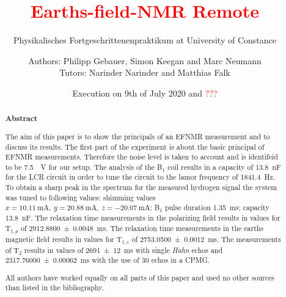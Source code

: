 \title{\textcolor{red}{Earths-field-NMR Remote}}
\subtitle{Physikalisches Fortgeschrittenenpraktikum at University of Constance}
\author{Authors: Philipp Gebauer, Simon Keegan and Marc Neumann \\ \large{Tutors: Narinder Narinder and Matthias Falk}}
\date{Execution on 9th of July 2020 and \textcolor{red}{???}}
\maketitle
\begin{abstract}
    \begin{center}
        \Large{\textsf{\textbf{Abstract}}}
    \end{center}
    \vspace{0.75 cm}
    \begin{singlespace}
    \noindent The aim of this paper is to show the principals of an EFNMR measurement and to discuss its results.\newline
    The first part of the experiment is about the basic principal of EFNMR measurements. Therefore the noise level is taken to account and is identifeid to be \SI{7.5}{\mu \volt} for our setup. The analysis of the B$_1$ coil results in a capacity of \SI{13.8}{\nano \farad} for the LCR circuit in order to tune the circuit to the lamor frequency of \SI{1841.4}{\hertz}. To obtain a sharp peak in the spectrum for the measured hydrogen signal the system was tuned to following values: shimming values $x = \SI{10.11}{\milli \ampere}, \ y = \SI{20.88}{\milli \ampere}, \ z = \SI{-20.07}{\milli \ampere}$; B$_1$ pulse duration \SI{1.35}{\milli \second}; capacity \SI{13.8}{\nano \farad}. The relaxation time measurements in the polarizing field results in values for T$_{1,p}$ of \SI{2912.8800 \pm 0.0048}{\milli \second}. The relaxation time measurements in the earths magnetic field results in values for T$_{1,e}$ of \SI{2753.0500 \pm 0.0012}{\milli \second}. The measurements of T$_2$ results in values of \SI{2691 \pm 12}{\milli \second} with single \textit{Hahn} echos and \SI{2317.76000 \pm 0.00062}{\milli \second} with the use of 30 echos in a CPMG.
    \vspace{0.75 cm}
     
    \noindent All authors have worked equally on all parts of this paper and used no other sources than listed in the bibliography.

\end{singlespace}
\end{abstract}

\thispagestyle{empty}
\newpage